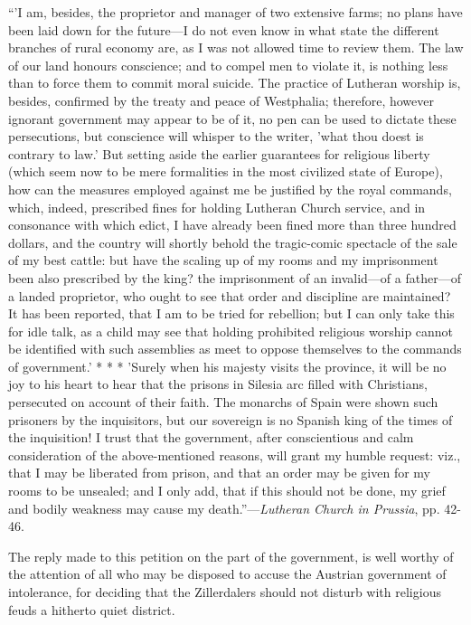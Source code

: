 ``'I am, besides, the proprietor and
manager of two extensive farms; no plans have been laid down for the
future—I do not even know in what state the different branches of
rural economy are, as I was not allowed time to review them. The law of
our land honours conscience; and to compel men to violate it, is nothing
less than to force them to commit moral suicide. The practice of
Lutheran worship is, besides, confirmed by the treaty and peace of
Westphalia; therefore, however ignorant government may appear to be of
it, no pen can be used to dictate these persecutions, but conscience
will whisper to the writer, 'what thou doest is contrary to law.' But
setting aside the earlier guarantees for religious liberty (which seem
now to be mere formalities in the most civilized state of Europe), how
can the measures employed against me be justified by the royal commands,
which, indeed, prescribed fines for holding Lutheran Church service, and
in consonance with which edict, I have already been fined more than
three hundred dollars, and the country will shortly behold the
tragic-comic spectacle of the sale of my best cattle: but have the
scaling up of my rooms and my imprisonment been also prescribed by the
king? the imprisonment of an invalid—of a father—of a landed
proprietor, who ought to see that order and discipline are maintained?
It has been reported, that I am to be tried for rebellion; but I can
only take this for idle talk, as a child may see that holding prohibited
religious worship cannot be identified with such assemblies as meet to
oppose themselves to the commands of government.'
* *
* 'Surely
when his majesty visits the province, it will be no joy to his heart to
hear that the prisons in Silesia arc filled with Christians, persecuted
on account of their faith. The monarchs of
Spain were shown such prisoners by the inquisitors, but our sovereign is
no Spanish king of the times of the inquisition! I trust that the
government, after conscientious and calm consideration of the
above-mentioned reasons, will grant my humble request: viz., that I may
be liberated from prison, and that an order may be given for my rooms to
be unsealed; and I only add, that if this should not be done, my grief
and bodily weakness may cause my death.''—\emph{Lutheran Church in Prussia},
pp. 42-46.

The reply made to this petition on the part of the
government, is well worthy of the attention of all who may be disposed
to accuse the Austrian government of intolerance, for deciding that the
Zillerdalers should not disturb with religious feuds a hitherto quiet
district.


